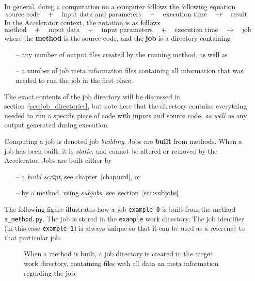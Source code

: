 In general, doing a computation on a computer follows the following
equation
\[
  \text{source code} \quad+\quad \text{input data and parameters}
  \quad+\quad \text{execution time} \quad\rightarrow\quad
  \text{result}
\]
In the Accelerator context, the notation is as follows
\[
  \text{method} \quad+\quad \text{input data} \quad+\quad \text{input
    parameters} \quad+\quad \text{execution time}
  \quad\rightarrow\quad \text{job}
\]
where the \textbf{method} is the source code, and the \textbf{job} is
a directory containing
\begin{itemize}
\item[--] any number of output files created by the running method, as well as
\item[--] a number of job meta information files containing all
  information that was needed to run the job in the first place.
\end{itemize}
The exact contents of the job directory will be discussed in
section~\ref{sec:job_directories}, but note here that the directory
contains everything needed to run a specific piece of code with inputs
and source code, \textsl{as well as} any output generated during
execution.

Computing a job is denoted job \textsl{building}.
Jobs are \textbf{built} from methods.  When a job has been built, it
is \textsl{static}, and cannot be altered or removed by the
Accelerator.  Jobs are built either by
\begin{itemize}
\item[--] a \textsl{build script}, see chapter~\ref{chap:urd}, or
\item[--] by a method, using \textsl{subjobs}, see~section~\ref{sec:subjobs}
\end{itemize}
The following figure illustrates how a job \texttt{example-0} is
built from the method \texttt{a\_method.py}.  The job is stored in the
\texttt{example} work directory.  The job identifier (in this case
\texttt{example-1}) is always unique so that it can be used as a
reference to that particular job.
\begin{figure}[h!]
  \begin{center}
    \hspace{2cm}
    \label{fig:method}
  \end{center}
  \caption{When a method is built, a job directory is created in the
    target work directory, containing files with all data an meta
    information regarding the job.}
\end{figure}



